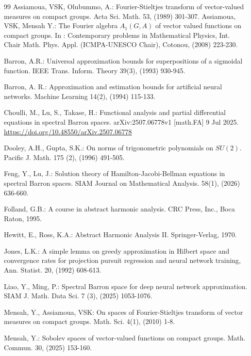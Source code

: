 \documentclass[12pt]{amsart}%
\begin{document}
\begin{thebibliography}{99}
  Assiamoua, VSK, Olubummo, A.: {Fourier-Stieltjes transform of vector-valued measures on compact groups}. Acta Sci. Math. { 53}, (1989) 301-307.
 Assiamoua, VSK, Mensah Y.: The Fourier algebra $A_1(G,A)$ of vector valued functions on compact groups. In : Contemporary problems in Mathematical Physics, Int. Chair Math. Phys. Appl. (ICMPA-UNESCO Chair), Cotonou, (2008) 223-230.

 Barron, A.R.:  Universal approximation bounds for superpositions of a sigmoidal function. IEEE Trans. Inform. Theory 39(3), (1993) 930-945. 

Barron, A. R.: Approximation and estimation bounds for artificial neural networks.  Machine Learning 14(2), (1994) 115-133. 

  Choulli, M.,  Lu, S., Takase, H.: Functional analysis and partial differential equations in spectral Barron spaces. arXiv:2507.06778v1 [math.FA] 9 Jul 2025. \url{https://doi.org/10.48550/arXiv.2507.06778
}

  Dooley, A.H.,  Gupta, S.K.:  On norms of trigonometric polynomials on $SU(2)$. Pacific J. Math. 175 (2), (1996) 491-505.

  Feng, Y.,    Lu,   J.: Solution theory of Hamilton-Jacobi-Bellman equations in spectral Barron spaces. SIAM Journal on Mathematical Analysis. 58(1), (2026) 636-660.

 Folland, G.B.:  A course in abstract harmonic analysis. CRC Press, Inc., Boca Raton, 1995.

 Hewitt, E.,  Ross, K.A.: Abstract Harmonic Analysis II. Springer-Verlag, 1970.

  Jones, L.K.: A simple lemma on greedy approximation in Hilbert space and convergence rates for projection pursuit regression and neural network training, Ann. Statist. 20, (1992) 608-613.

  Liao,  Y.,    Ming, P.:  Spectral Barron space for deep neural network approximation.
SIAM J. Math. Data Sci.   7 (3),  (2025) 1053-1076.

  Mensah, Y.,  Assiamoua, VSK: On spaces of Fourier-Stieltjes transform of vector measures on compact groups.  { Math. Sci.} 4(1),  (2010) 1-8. 

 Mensah, Y.: Sobolev spaces of vector-valued functions on compact groups. Math. Commun. 30, (2025) 153-160.


\end{thebibliography}
\end{document}
